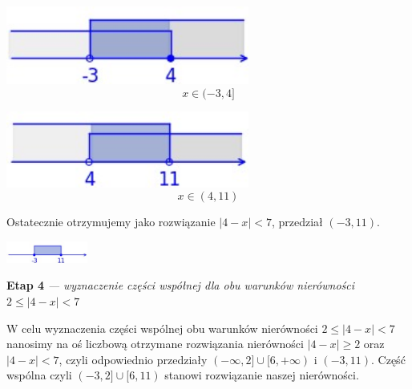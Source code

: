 \documentclass[12pt, a4paper]{report}
\begin{document}
    \begin{center}
        \begin{minipage}{0.3\textwidth}
            \centering
            \includegraphics[width=0.6\textwidth]{fig_5.jpg}
            \[x \in (-3,4]\]
        \end{minipage}
        \hspace{0.01\textwidth}
        \begin{minipage}{0.01\textwidth}
        \end{minipage}
        \hspace{0.1\textwidth}
        \begin{minipage}{0.3\textwidth}
            \centering
            \includegraphics[width=0.6\textwidth]{fig_6.jpg}
            \[x \in (4, 11)\]
        \end{minipage}
    \end{center}

    \bigskip

    \noindent
    Ostatecznie otrzymujemy jako rozwiązanie $|4 - x| < 7$, przedział $(-3, 11)$.

    \begin{center}
        \includegraphics[width=0.2\textwidth]{fig_7.jpg}
    \end{center}

    \vspace{15pt}                            %

    \noindent
    \textbf{Etap 4}
    \emph{ --- wyznaczenie części współnej dla obu warunków nierówności $2 \leq |4 - x| < 7$}

    \noindent
    W celu wyznaczenia części wspólnej obu warunków nierówności $2 \leq |4 - x| < 7$ nanosimy na oś
    liczbową otrzymane rozwiązania nierówności $|4 - x| \geq 2$ oraz $|4 - x| < 7$, czyli odpowiednio przedziały
    $(-\infty, 2] \cup [6, +\infty)$ i $(-3, 11)$. Część wspólna czyli $(-3, 2] \cup [6, 11)$ stanowi rozwiązanie naszej nierówności.
\end{document}
